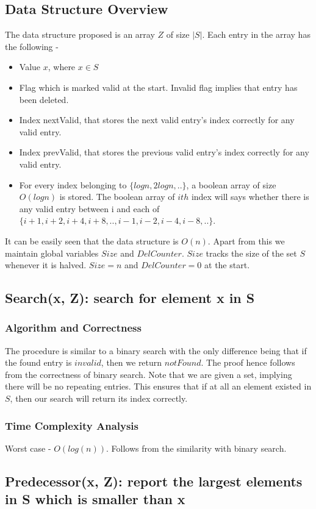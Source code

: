 \documentclass{article}
\begin{document}
\subsection{Data Structure Overview}
The data structure proposed is an array $Z$ of size $|S|$. Each entry in the array has the following -
\begin{itemize}
\item Value $x$, where $x \in S$
\item Flag which is marked valid at the start. Invalid flag implies that entry has been deleted.
\item Index nextValid, that stores the next valid entry's index correctly for any valid entry.
\item Index prevValid, that stores the previous valid entry's index correctly for any valid entry.
\item For every index belonging to $\{logn,2logn,.. \}$, a boolean array of size $O(logn)$ is stored. The boolean array of $ith$ index will says whether there is any valid entry between i and each of  $\{i+1,i+2,i+4,i+8,..,i-1,i-2,i-4,i-8,..\}$. 
\end{itemize}
It can be easily seen that the data structure is $O(n)$. Apart from this we maintain global variables $Size$ and $DelCounter$. $Size$ tracks the size of the set $S$ whenever it is halved. $Size = n$ and $DelCounter = 0$ at the start.
\subsection{Search(x, Z): search for element x in S}
\subsubsection{Algorithm and Correctness}
The procedure is similar to a binary search with the only difference being that if the found entry is $invalid$, then we return $notFound$. The proof hence follows from the correctness of binary search. Note that we are given a set, implying there will be no repeating entries. This ensures that if at all an element existed in $S$, then our search will return its index correctly.
\subsubsection{Time Complexity Analysis}
Worst case - $O(log(n))$. Follows from the similarity with binary search.
\subsection{Predecessor(x, Z): report the largest elements in S which is smaller than x}
\end{document}
